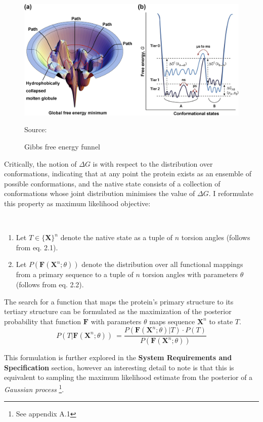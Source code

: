 \begin{figure}[!htb]
    \caption{Gibbs free energy funnel}
    \begin{center}
        \includegraphics[trim={0 0 4cm 0.25cm},scale=1, clip]{Figures/FreeEnergyLandscape}
    \end{center}
    \scriptsize{\dag Source: \cite{Yang}}
 \end{figure}

Critically, the notion of $\Delta G$ is with respect to the distribution
over conformations, indicating that at any point the protein exists as an
ensemble of possible conformations, and the native state consists of a
collection of conformations whose joint distribution minimises the value of $\Delta G$.
I reformulate this property as maximum likelihood objective:
\begin{theorem}
    \
    \begin{enumerate}
        \item Let $T \in \mathbf{\{X\}}^n$ denote the native state as a tuple of $n$ torsion angles (follows from eq. 2.1).
        \item Let $P(\mathbf{F}(\mathbf{X}^n; \theta))$ denote the distribution over all
        functional mappings from a primary sequence to a tuple of $n$ torsion
        angles with parameters $\theta$ (follows from eq. 2.2).
    \end{enumerate}
    The search for a function that maps the protein's primary structure to its tertiary structure
    can be formulated as the maximization of the posterior probability
    that function $\mathbf{F}$ with parameters $\theta$ maps sequence $\mathbf{X}^n$ to state $T$.
    \begin{equation}
        P(T | \mathbf{F}(\mathbf{X}^n; \theta))\ =\frac{P(\mathbf{F}(\mathbf{X}^n; \theta) | T) \cdot P(T)}{P(\mathbf{F}(\mathbf{X}^n; \theta))}
    \end{equation}
\end{theorem}                                                                                                                                                                                                                                                     
This formulation is further explored in the \textbf{System Requirements and Specification}
section, however an interesting detail to note is that this is equivalent to sampling
the maximum likelihood estimate from the posterior of a \emph{Gaussian process} \footnote{See appendix A.1}.

